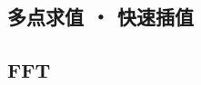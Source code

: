 \documentclass{probook}
\begin{document}
\begin{multicols}{2}


\subsection{多点求值 ・ 快速插值}



\subsection{FFT}











% 




% 



% 



\end{multicols}
\end{document}
